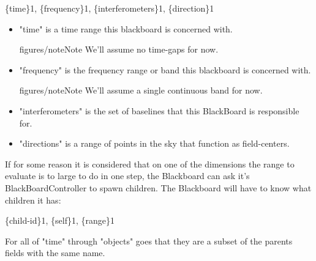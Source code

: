 \documentclass[]{lofar}
\begin{document}
    \{time\}1, \{frequency\}1, \{interferometers\}1, \{direction\}1
    \begin{itemize}

	\item 


       "time" is a time range this blackboard is concerned
       with. 
\begin{admonition}{figures/note}{Note}%
We'll assume no time-gaps for now.\end{admonition}




	\item 


       "frequency" is the frequency range or band this blackboard is
       concerned with.  
\begin{admonition}{figures/note}{Note}%
We'll assume a single continuous band for
       now.\end{admonition}




	\item 


       "interferometers" is the set of baselines that this BlackBoard is
       responsible for.

      


	\item 


       "directions" is a range of points in the sky that function as
       field-centers.

      

\end{itemize}




    If for some reason it is considered that on one of the dimensions
    the range to evaluate is to large to do in one step, the Blackboard
    can ask it's BlackBoardController to spawn children. The Blackboard
    will have to know what children it has:

   



    \{child-id\}1, \{self\}1, \{range\}1

   



    For all of "time" through "objects" goes that they are a subset of
    the parents fields with the same name.

   
\end{document}
